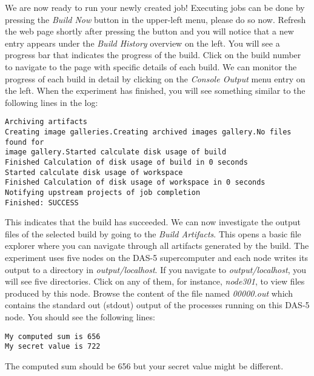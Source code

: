 \documentclass{article}
\begin{document}
We are now ready to run your newly created job!
Executing jobs can be done by pressing the \emph{Build Now} button in the upper-left menu, please do so now.
Refresh the web page shortly after pressing the button and you will notice that a new entry appears under the \emph{Build History} overview on the left.
You will see a progress bar that indicates the progress of the build.
Click on the build number to navigate to the page with specific details of each build.
We can monitor the progress of each build in detail by clicking on the \emph{Console Output} menu entry on the left.
When the experiment has finished, you will see something similar to the following lines in the log:

\begin{lstlisting}[frame=single]  % Start your code-block
Archiving artifacts
Creating image galleries.Creating archived images gallery.No files found for
image gallery.Started calculate disk usage of build
Finished Calculation of disk usage of build in 0 seconds
Started calculate disk usage of workspace
Finished Calculation of disk usage of workspace in 0 seconds
Notifying upstream projects of job completion
Finished: SUCCESS
\end{lstlisting}

This indicates that the build has succeeded.
We can now investigate the output files of the selected build by going to the \emph{Build Artifacts}.
This opens a basic file explorer where you can navigate through all artifacts generated by the build.
The experiment uses five nodes on the DAS-5 supercomputer and each node writes its output to a directory in \emph{output/localhost}.
If you navigate to \emph{output/localhost}, you will see five directories.
Click on any of them, for instance, \emph{node301}, to view files produced by this node.
Browse the content of the file named \emph{00000.out} which contains the standard out (stdout) output of the processes running on this DAS-5 node.
You should see the following lines:

\begin{lstlisting}[frame=single]
My computed sum is 656
My secret value is 722
\end{lstlisting}

The computed sum should be 656 but your secret value might be different.


{\small }
\end{document}
